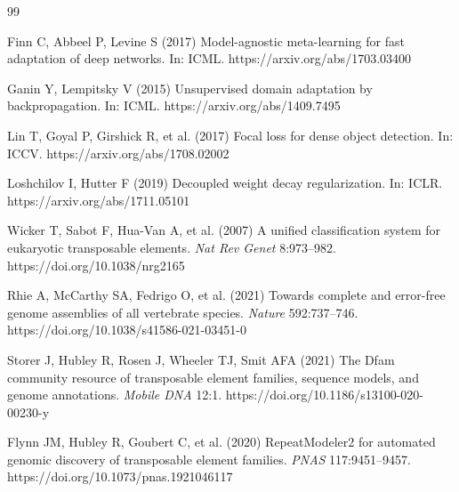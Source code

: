 \documentclass[12pt]{article}
\begin{document}
\begin{thebibliography}{99}

Finn C, Abbeel P, Levine S (2017) Model-agnostic meta-learning for fast adaptation of deep networks. In: ICML. https://arxiv.org/abs/1703.03400

Ganin Y, Lempitsky V (2015) Unsupervised domain adaptation by backpropagation. In: ICML. https://arxiv.org/abs/1409.7495


Lin T, Goyal P, Girshick R, et al. (2017) Focal loss for dense object detection. In: ICCV. https://arxiv.org/abs/1708.02002


Loshchilov I, Hutter F (2019) Decoupled weight decay regularization. In: ICLR. https://arxiv.org/abs/1711.05101

Wicker T, Sabot F, Hua-Van A, et al. (2007) A unified classification system for eukaryotic transposable elements. \textit{Nat Rev Genet} 8:973--982. https://doi.org/10.1038/nrg2165

Rhie A, McCarthy SA, Fedrigo O, et al. (2021) Towards complete and error-free genome assemblies of all vertebrate species. \textit{Nature} 592:737--746. https://doi.org/10.1038/s41586-021-03451-0

Storer J, Hubley R, Rosen J, Wheeler TJ, Smit AFA (2021) The Dfam community resource of transposable element families, sequence models, and genome annotations. \textit{Mobile DNA} 12:1. https://doi.org/10.1186/s13100-020-00230-y

Flynn JM, Hubley R, Goubert C, et al. (2020) RepeatModeler2 for automated genomic discovery of transposable element families. \textit{PNAS} 117:9451--9457. https://doi.org/10.1073/pnas.1921046117


\end{thebibliography}
\end{document}
